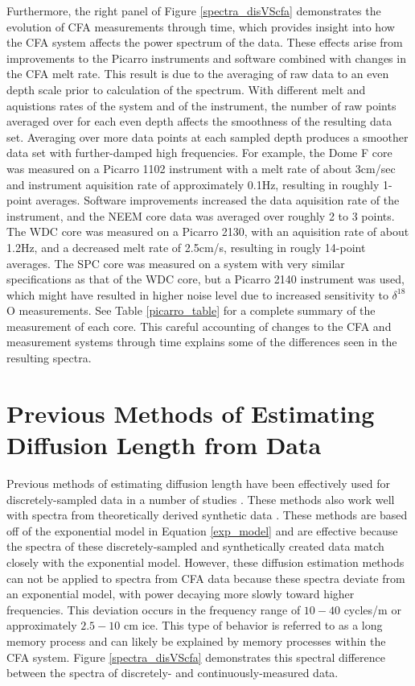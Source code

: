 \documentclass[draft, jgrga]{AGUTeX}
\begin{document}
\begin{article}
Furthermore, the right panel of Figure \ref{spectra_disVScfa} demonstrates the evolution of CFA measurements through time, which provides insight into how the CFA system affects the power spectrum of the data. These effects arise from improvements to the Picarro instruments and software combined with changes in the CFA melt rate. This result is due to the averaging of raw data to an even depth scale prior to calculation of the spectrum. With different melt and aquistions rates of the system and of the instrument, the number of raw points averaged over for each even depth affects the smoothness of the resulting data set. Averaging over more data points at each sampled depth produces a smoother data set with further-damped high frequencies. For example, the Dome F core was measured on a Picarro 1102 instrument with a melt rate of about 3cm/sec and instrument aquisition rate of approximately 0.1Hz, resulting in roughly 1-point averages. Software improvements increased the data aquisition rate of the instrument, and the NEEM core data was averaged over roughly 2 to 3 points. The WDC core was measured on a Picarro 2130, with an aquisition rate of about 1.2Hz, and a decreased melt rate of 2.5cm/s, resulting in rougly 14-point averages. The SPC core was measured on a system with very similar specifications as that of the WDC core, but a Picarro 2140 instrument was used, which might have resulted in higher noise level due to increased sensitivity to $\delta^{18}$O measurements. See Table \ref{picarro_table} for a complete summary of the measurement of each core. This careful accounting of changes to the CFA and measurement systems through time explains some of the differences seen in the resulting spectra.



\section{Previous Methods of Estimating Diffusion Length from Data}

Previous methods of estimating diffusion length have been effectively used for discretely-sampled data in a number of studies \citep{Johnsen2000,Simonsen2011,Gkinis2014,vanderWel2015}. These methods also work well with spectra from theoretically derived synthetic data \citep{Holme2017}. These methods are based off of the exponential model in Equation \ref{exp_model} and are effective because the spectra of these discretely-sampled and synthetically created data match closely with the exponential model. However, these diffusion estimation methods can not be applied to spectra from CFA data because these spectra deviate from an exponential model, with power decaying more slowly toward higher frequencies.  This deviation occurs in the frequency range of $10-40$ cycles/m or approximately $2.5-10$ cm ice. This type of behavior is referred to as a long memory process and can likely be explained by memory processes within the CFA system. Figure \ref{spectra_disVScfa} demonstrates this spectral difference between the spectra of discretely- and continuously-measured data.


\end{article}
\end{document}
